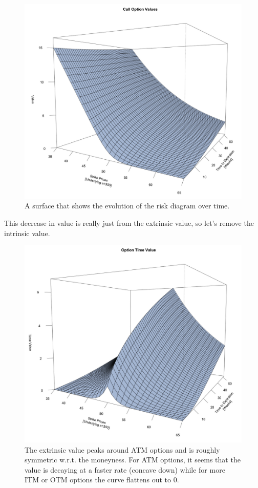 \documentclass{article}
\begin{document}
    \begin{figure}[H]
      \centering 
      \includegraphics[scale=0.4]{img/theta1.png}
      \caption{A surface that shows the evolution of the risk diagram over time. } 
      \label{fig:theta1}
    \end{figure}

    This decrease in value is really just from the extrinsic value, so let's remove the intrinsic value. 

    \begin{figure}[H]
      \centering 
      \includegraphics[scale=0.4]{img/theta2.png}
      \caption{The extrinsic value peaks around ATM options and is roughly symmetric w.r.t. the moneyness. For ATM options, it seems that the value is decaying at a faster rate (concave down) while for more ITM or OTM options the curve flattens out to $0$. } 
      \label{fig:theta2}
    \end{figure}
\end{document}
